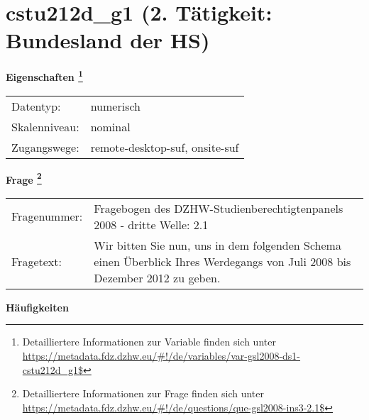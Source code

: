 
    \setcounter{footnote}{0}

    \vspace*{-1.8cm}
	\section{cstu212d\_g1 (2. Tätigkeit: Bundesland der HS)}
	\label{section:cstu212d_g1}



    \vspace*{0.5cm}
    \noindent\textbf{Eigenschaften
	\footnote{Detailliertere Informationen zur Variable finden sich unter
		\url{https://metadata.fdz.dzhw.eu/\#!/de/variables/var-gsl2008-ds1-cstu212d_g1$}}}\\
	\begin{tabularx}{\hsize}{@{}lX}
	Datentyp: & numerisch \\
	Skalenniveau: & nominal \\
	Zugangswege: &
	  remote-desktop-suf, 
	  onsite-suf
 \\
    \end{tabularx}



				\vspace*{0.5cm}
                \noindent\textbf{Frage
	                \footnote{Detailliertere Informationen zur Frage finden sich unter
		              \url{https://metadata.fdz.dzhw.eu/\#!/de/questions/que-gsl2008-ins3-2.1$}}}\\
				\begin{tabularx}{\hsize}{@{}lX}
					Fragenummer: &
					  Fragebogen des DZHW-Studienberechtigtenpanels 2008 - dritte Welle:
					  2.1
 \\
					Fragetext: & Wir bitten Sie nun, uns in dem folgenden Schema einen Überblick Ihres Werdegangs von Juli 2008 bis Dezember 2012 zu geben. \\
				\end{tabularx}





        		\vspace*{0.5cm}
                \noindent\textbf{Häufigkeiten}

